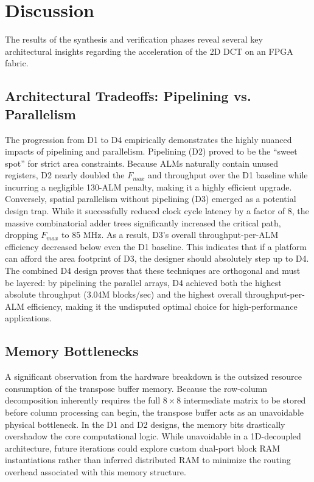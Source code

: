 \section{Discussion}

The results of the synthesis and verification phases reveal several key architectural insights regarding the acceleration of the 2D DCT on an FPGA fabric.

\subsection{Architectural Tradeoffs: Pipelining vs. Parallelism}
The progression from D1 to D4 empirically demonstrates the highly nuanced impacts of pipelining and parallelism. Pipelining (D2) proved to be the ``sweet spot'' for strict area constraints. Because ALMs naturally contain unused registers, D2 nearly doubled the $F_{max}$ and throughput over the D1 baseline while incurring a negligible 130-ALM penalty, making it a highly efficient upgrade. Conversely, spatial parallelism without pipelining (D3) emerged as a potential design trap. While it successfully reduced clock cycle latency by a factor of 8, the massive combinatorial adder trees significantly increased the critical path, dropping $F_{max}$ to 85 MHz. As a result, D3's overall throughput-per-ALM efficiency decreased below even the D1 baseline. This indicates that if a platform can afford the area footprint of D3, the designer should absolutely step up to D4. The combined D4 design proves that these techniques are orthogonal and must be layered: by pipelining the parallel arrays, D4 achieved both the highest absolute throughput (3.04M blocks/sec) and the highest overall throughput-per-ALM efficiency, making it the undisputed optimal choice for high-performance applications.

\subsection{Memory Bottlenecks}
A significant observation from the hardware breakdown is the outsized resource consumption of the transpose buffer memory. Because the row-column decomposition inherently requires the full $8 \times 8$ intermediate matrix to be stored before column processing can begin, the transpose buffer acts as an unavoidable physical bottleneck. In the D1 and D2 designs, the memory bits drastically overshadow the core computational logic. While unavoidable in a 1D-decoupled architecture, future iterations could explore custom dual-port block RAM instantiations rather than inferred distributed RAM to minimize the routing overhead associated with this memory structure.

